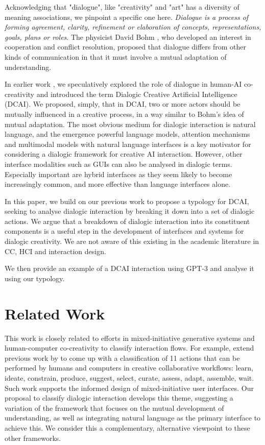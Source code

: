 \documentclass[manuscript,review]{acmart}
\begin{document}
Acknowledging that "dialogue", like "creativity" and "art" has a diversity of meaning associations, we pinpoint a specific one here. \emph{Dialogue is a process of forming agreement, clarity, refinement or elaboration of concepts, representations, goals, plans or roles}. The physicist David Bohm \cite{bohm2004dialogue}, who developed an interest in cooperation and conflict resolution, proposed that dialogue differs from other kinds of communication in that it must involve a mutual adaptation of understanding. 

In earlier work \citep{bownspeculative2020}, we speculatively explored the role of dialogue in human-AI co-creativity and introduced the term Dialogic Creative Artificial Intelligence (DCAI). We proposed, simply, that in DCAI, two or more actors should be mutually influenced in a creative process, in a way similar to Bohm's idea of mutual adaptation. The most obvious medium for dialogic interaction is natural language, and the emergence powerful language models, attention mechanisms and multimodal models with natural language interfaces is a key motivator for considering a dialogic framework for creative AI interaction. However, other interface modalities such as GUIs can also be analysed in dialogic terms. Especially important are hybrid interfaces as they seem likely to become increasingly common, and more effective than language interfaces alone.

In this paper, we build on our previous work to propose a typology for DCAI, seeking to analyse dialogic interaction by breaking it down into a set of dialogic actions. We argue that a breakdown of dialogic interaction into its constituent components is a useful step in the development of interfaces and systems for dialogic creativity. We are not aware of this existing in the academic literature in CC, HCI and interaction design. 

We then provide an example of a DCAI interaction using GPT-3 and analyse it using our typology. 

\section{Related Work}

This work is closely related to efforts in mixed-initiative generative systems and human-computer co-creativity to classify interaction flows. For example, \citet{mullermixed} extend previous work by \citep{spoto17} to come up with a classification of 11 actions that can be performed by humans and computers in creative collaborative workflows: learn, ideate, constrain, produce, suggest, select, curate, assess, adapt, assemble, wait. Such work supports the informed design of mixed-initiative user interfaces. Our proposal to classify dialogic interaction develops this theme, suggesting a variation of the framework that focuses on the mutual development of understanding, as well as integrating natural language as the primary interface to achieve this. We consider this a complementary, alternative viewpoint to these other frameworks. 
\end{document}
